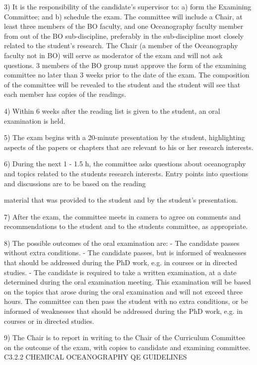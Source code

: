 \documentclass{article}
\begin{document}
3)	It is the responsibility of the candidate’s supervisor to: a) form the Examining Committee; and b) schedule the exam. The committee will include a Chair, at least three members of the BO faculty, and one Oceanography faculty member from out of the BO sub-discipline, preferably in the sub-discipline most closely related to the student’s research. The Chair (a member of the Oceanography faculty not in BO) will serve as moderator of the exam and will not ask questions. 3 members of the BO group must approve the form of the examining committee no later than 3 weeks prior to the date of the exam. The composition of the committee will be revealed to the student and the student will see that each member has copies of the readings.

4)	Within 6 weeks after the reading list is given to the student, an oral examination is held.

5)	The exam begins with a 20-minute presentation by the student, highlighting aspects of the papers or chapters that are relevant to his or her research interests.

6)	During the next 1 - 1.5 h, the committee asks questions about oceanography and topics related to the students research interests. Entry points into questions and discussions are to be based on the reading
 

material that was provided to the student and by the student’s presentation.

7)	After the exam, the committee meets in camera to agree on comments and recommendations to the student and to the students committee, as appropriate.

8)	The possible outcomes of the oral examination are:
-	The candidate passes without extra conditions.
-	The candidate passes, but is informed of weaknesses that should be addressed during the PhD work,
e.g. in courses or in directed studies.
-	The candidate is required to take a written examination, at a date determined during the oral examination meeting. This examination will be based on the topics that arose during the oral examination and will not exceed three hours. The committee can then pass the student with no extra conditions, or be informed of weaknesses that should be addressed during the PhD work, e.g. in courses or in directed studies.

9)	The Chair is to report in writing to the Chair of the Curriculum Committee on the outcome of the exam, with copies to candidate and examining committee.
C3.2.2  CHEMICAL OCEANOGRAPHY QE GUIDELINES
\end{document}
